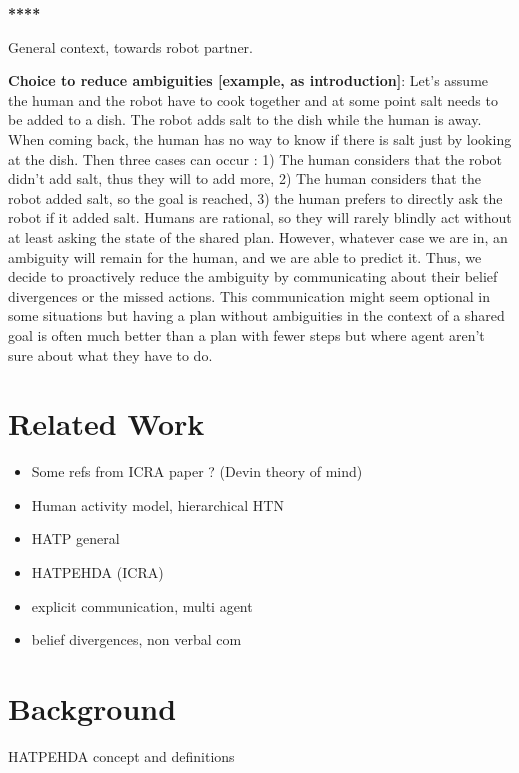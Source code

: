 \documentclass[letterpaper]{article} %
\begin{document}
\textbf{**** }
% 

General context, towards robot partner. 


\textbf{Choice to reduce ambiguities [example, as introduction]}:
Let's assume the human and the robot have to cook together and at some point salt needs to be added to a dish. The robot adds salt to the dish while the human is away. When coming back, the human has no way to know if there is salt just by looking at the dish.
Then three cases can occur : 1) The human considers that the robot didn't add salt, thus they will to add more, 2) The human considers that the robot added salt, so the goal is reached, 3) the human prefers to directly ask the robot if it added salt. 
Humans are rational, so they will rarely blindly act without at least asking the state of the shared plan. However, whatever case we are in, an ambiguity will remain for the human, and we are able to predict it. Thus, we decide to proactively reduce the ambiguity by communicating about their belief divergences or the missed actions. This communication might seem optional in some situations but having a plan without ambiguities in the context of a shared goal is often much better than a plan with fewer steps but where agent aren't sure about what they have to do.

\section{Related Work}

\begin{itemize}
    \item Some refs from ICRA paper ? (Devin theory of mind) 
    \item Human activity model, hierarchical HTN
    \item HATP general
    \item HATPEHDA (ICRA)
    \item explicit communication, multi agent 
    \item belief divergences, non verbal com
\end{itemize}

\section{Background}
HATPEHDA concept and definitions
\end{document}
